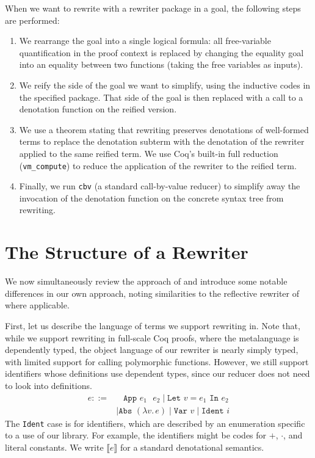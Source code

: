 \documentclass[sigplan,10pt,review,anonymous]{acmart}\settopmatter{printfolios=true,printccs=false,printacmref=false}
\newcommand{\todo}[1]{\textbf{TODO: #1}}
\newcommand{\defeq}{=}
\begin{document}
When we want to rewrite with a rewriter package in a goal, the following steps are performed:
\begin{enumerate}
\item
  We rearrange the goal into a single logical formula: all free-variable quantification in the proof context is replaced by changing the equality goal into an equality between two functions (taking the free variables as inputs).
\item
  We reify the side of the goal we want to simplify, using the inductive codes in the specified package.  That side of the goal is then replaced with a call to a denotation function on the reified version.
\item
  We use a theorem stating that rewriting preserves denotations of well-formed terms to replace the denotation subterm with the denotation of the rewriter applied to the same reified term.
  We use Coq's built-in full reduction (\texttt{vm\_compute}) to reduce the application of the rewriter to the reified term.
\item
  Finally, we run \texttt{cbv} (a standard call-by-value reducer) to simplify away the invocation of the denotation function on the concrete syntax tree from rewriting.
\end{enumerate}


\section{The Structure of a Rewriter} \label{sec:structure}

We now simultaneously review the approach of \citet{Aehlig} and introduce some notable differences in our own approach, noting similarities to the reflective rewriter of \citet{rtac} where applicable.

First, let us describe the language of terms we support rewriting in.
Note that, while we support rewriting in full-scale Coq proofs, where the metalanguage is dependently typed, the object language of our rewriter is nearly simply typed, with limited support for calling polymorphic functions.
However, we still support identifiers whose definitions use dependent types, since our reducer does not need to look into definitions.
\begin{align*}
  e ::={}& \phantom{\mid} \texttt{App }e_1\texttt{ }e_2 \mid \texttt{Let }v \defeq e_1\texttt{ In }e_2 \\
  & \mid \texttt{Abs }(\lambda v.\,e) \mid \texttt{Var }v \mid \texttt{Ident }i
\end{align*}
The \texttt{Ident} case is for identifiers, which are described by an enumeration specific to a use of our library.
For example, the identifiers might be codes for $+$, $\cdot$, and literal constants.
We write $\llbracket e \rrbracket$ for a standard denotational semantics.
\end{document}
